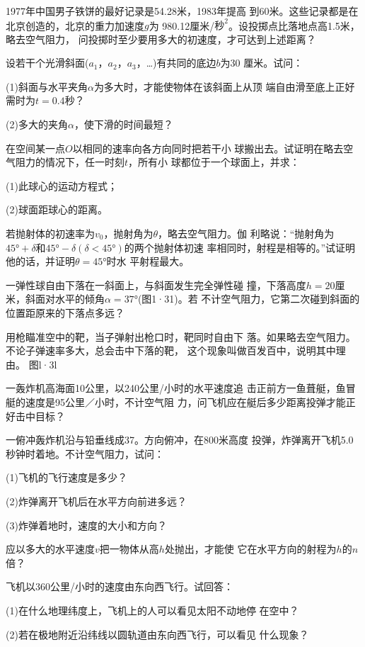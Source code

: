 \exercise 1977年中国男子铁饼的最好记录是54.28米，1983年提高
到60米。这些记录都是在北京创造的，北京的重力加速度$g$为
980.12厘米/$\text{秒}^2$。设投掷点比落地点高1.5米，略去空气阻力，
问投掷时至少要用多大的初速度，才可达到上述距离？

\exercise 设若干个光滑斜面($a_1$，$a_2$，$a_3$，…)有共同的底边$b$为30
厘米。试问：

(1)斜面与水平夹角$\alpha$为多大时，才能使物体在该斜面上从顶
端自由滑至底上正好需时为$t=0.4$秒？

(2)多大的夹角$\alpha$，使下滑的时间最短？

\exercise 在空间某一点$O$以相同的速率向各方向同时把若干小
球搬出去。试证明在略去空气阻力的情况下，任一时刻$t$，所有小
球都位于一个球面上，并求：

(1)此球心的运动方程式；

(2)球面距球心的距离。

\exercise 若抛射体的初速率为$v_0$，抛射角为$\theta$，略去空气阻力。伽
利略说：“抛射角为$\ang{45;;}+\delta$和$\ang{45;;}-\delta(\delta<\ang{45;;})$的两个抛射体初速
率相同时，射程是相等的。”试证明他的话，并证明$\theta=\ang{45;;}$时水
平射程最大。

\exercise 一弹性球自由下落在一斜面上，与斜面发生完全弹性碰
撞，下落高度$h=20$厘米，斜面对水平的倾角$\alpha=\ang{37;;}$(图1·31)。若
不计空气阻力，它第二次碰到斜面的位置距原来的下落点多远？

\exercise 用枪瞄准空中的靶，当子弹射出枪口时，靶同时自由下
落。如果略去空气阻力。不论子弹速率多大，总会击中下落的靶，
这个现象叫做百发百中，说明其中理由。
图l·3l

\exercise 一轰炸机高海面10公里，以240公里/小时的水平速度追
击正前方一鱼葺艇，鱼冒艇的速度是95公里／小时，不计空气阻
力，问飞机应在艇后多少距离投弹才能正好击中目标？

\exercise 一俯冲轰炸机沿与铅垂线成37。方向俯冲，在800米高度
投弹，炸弹离开飞机5.0秒钟时着地。不计空气阻力，试问：

(1)飞机的飞行速度是多少？

(2)炸弹离开飞机后在水平方向前进多远？

(3)炸弹着地时，速度的大小和方向？

\exercise 应以多大的水平速度$v$把一物体从高$h$处抛出，才能使
它在水平方向的射程为$h$的$n$倍？

\exercise 飞机以360公里/小时的速度由东向西飞行。试回答：

(1)在什么地理纬度上，飞机上的人可以看见太阳不动地停
在空中？

(2)若在极地附近沿纬线以圆轨道由东向西飞行，可以看见
什么现象？

